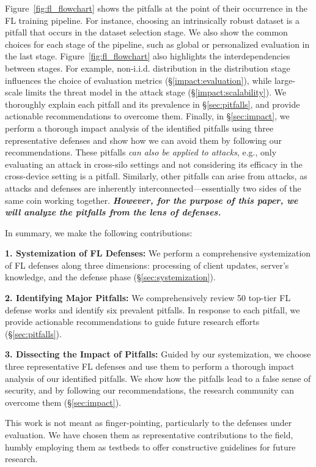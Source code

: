 Figure~\ref{fig:fl_flowchart} shows the pitfalls at the point of their occurrence in the FL training pipeline. For instance, choosing an intrinsically robust dataset is a pitfall that occurs in the dataset selection stage. We also show the common choices for each stage of the pipeline, such as global or personalized evaluation in the last stage. Figure~\ref{fig:fl_flowchart} also highlights the interdependencies between stages. For example, non-i.i.d. distribution in the distribution stage influences the choice of evaluation metrics (\S\ref{impact:evaluation}), while large-scale limits the threat model in the attack stage (\S\ref{impact:scalability}). We thoroughly explain each pitfall and its prevalence in \S\ref{sec:pitfalls}, and provide actionable recommendations to overcome them. Finally, in \S\ref{sec:impact}, we perform a thorough impact analysis of the identified pitfalls using three representative defenses and show how we can avoid them by following our recommendations.
These pitfalls \emph{can also be applied to attacks}, e.g., only evaluating an attack in cross-silo settings and not considering its efficacy in the cross-device setting is a pitfall. Similarly, other pitfalls can arise from attacks, as attacks and defenses are inherently interconnected—essentially two sides of the same coin working together. \textbf{\emph{However, for the purpose of this paper, we will analyze the pitfalls from the lens of defenses.}}

\noindent In summary, we make the following contributions:

\noindent\textbf{1. Systemization of FL Defenses:} We perform a comprehensive systemization of FL defenses along three dimensions: processing of client updates, server's knowledge, and the defense phase (\S\ref{sec:systemization}).

\noindent\textbf{2. Identifying Major Pitfalls:} We comprehensively review 50 top-tier FL defense works and identify six prevalent pitfalls. In response to each pitfall, we provide actionable recommendations to guide future research efforts (\S\ref{sec:pitfalls}).

\noindent\textbf{3. Dissecting the Impact of Pitfalls:} Guided by our systemization, we choose three representative FL defenses and use them to perform a thorough impact analysis of our identified pitfalls. We show how the pitfalls lead to a false sense of security, and by following our recommendations, the research community can overcome them (\S\ref{sec:impact}).

\begin{mybox}
    This work is not meant as finger-pointing, particularly to the defenses under evaluation. We have chosen them as representative contributions to the field, humbly employing them as testbeds to offer constructive guidelines for future research.
\end{mybox}

